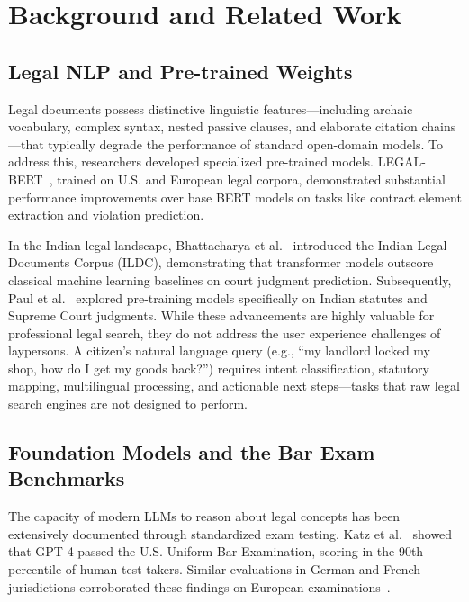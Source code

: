 \documentclass[conference]{IEEEtran}
\begin{document}
\section{Background and Related Work}
\label{sec:related}

\subsection{Legal NLP and Pre-trained Weights}
Legal documents possess distinctive linguistic features---including archaic vocabulary, complex syntax, nested passive clauses, and elaborate citation chains---that typically degrade the performance of standard open-domain models. To address this, researchers developed specialized pre-trained models. LEGAL-BERT~\cite{chalkidis2020}, trained on U.S. and European legal corpora, demonstrated substantial performance improvements over base BERT models on tasks like contract element extraction and violation prediction. 

In the Indian legal landscape, Bhattacharya et al.~\cite{bhattacharya2021} introduced the Indian Legal Documents Corpus (ILDC), demonstrating that transformer models outscore classical machine learning baselines on court judgment prediction. Subsequently, Paul et al.~\cite{paul2023} explored pre-training models specifically on Indian statutes and Supreme Court judgments. While these advancements are highly valuable for professional legal search, they do not address the user experience challenges of laypersons. A citizen's natural language query (e.g., ``my landlord locked my shop, how do I get my goods back?'') requires intent classification, statutory mapping, multilingual processing, and actionable next steps---tasks that raw legal search engines are not designed to perform.

\subsection{Foundation Models and the Bar Exam Benchmarks}
The capacity of modern LLMs to reason about legal concepts has been extensively documented through standardized exam testing. Katz et al.~\cite{katz2024} showed that GPT-4 passed the U.S. Uniform Bar Examination, scoring in the 90th percentile of human test-takers. Similar evaluations in German and French jurisdictions corroborated these findings on European examinations~\cite{trautmann2022}. 
\end{document}
